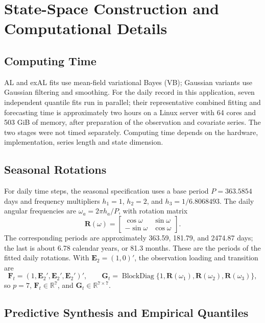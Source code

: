 \section{State-Space Construction and Computational Details}
\label{app:stateconstruction}

\subsection{Computing Time}
\label{app:computationtime}

AL and exAL fits use mean-field variational Bayes (VB); Gaussian variants use Gaussian filtering and smoothing. For the daily record in this application, seven independent quantile fits run in parallel; their representative combined fitting and forecasting time is approximately two hours on a Linux server with 64 cores and 503 GiB of memory, after preparation of the observation and covariate series. The two stages were not timed separately. Computing time depends on the hardware, implementation, series length and state dimension.

\subsection{Seasonal Rotations}
\label{app:seasonalconstruction}

For daily time steps, the seasonal specification uses a base period \(P=363.5854\) days and frequency multipliers \(h_1=1\), \(h_2=2\), and \(h_3=1/6.8068493\). The daily angular frequencies are \(\omega_a=2\pi h_a/P\), with rotation matrix
\[
\mathbf R(\omega)=
\begin{bmatrix}\cos\omega&\sin\omega\\-\sin\omega&\cos\omega\end{bmatrix}.
\]
The corresponding periods are approximately 363.59, 181.79, and 2474.87 days; the last is about 6.78 calendar years, or 81.3 months. These are the periods of the fitted daily rotations. With \(\mathbf E_2=(1,0)'\), the observation loading and transition are
\[
\mathbf F_t=(1,\mathbf E_2',\mathbf E_2',\mathbf E_2')',\qquad
\mathbf G_t=\operatorname{BlockDiag}\{1,\mathbf R(\omega_1),\mathbf R(\omega_2),\mathbf R(\omega_3)\},
\]
so \(p=7\), \(\mathbf F_t\in\mathbb R^7\), and \(\mathbf G_t\in\mathbb R^{7\times7}\).

\subsection{Predictive Synthesis and Empirical Quantiles}
\label{app:numericalprediction}

